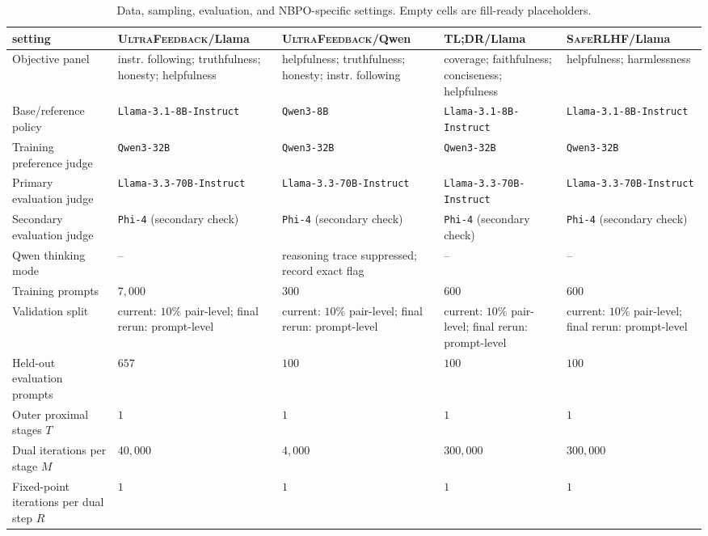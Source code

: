 \documentclass{article}
\theoremstyle{remark}
\theoremstyle{plain}
\begin{document}
\begin{table}[t]
\centering\scriptsize
\setlength{\tabcolsep}{1.1pt}
\caption{Data, sampling, evaluation, and NBPO-specific settings. Empty cells are fill-ready placeholders.}
\label{tab:data-sampling-hparams}
\begin{tabular}{@{}p{}p{}p{}p{}p{}@{}}
\toprule
setting & \textsc{UltraFeedback}/Llama & \textsc{UltraFeedback}/Qwen & \textsc{TL;DR}/Llama & \textsc{SafeRLHF}/Llama \\
\midrule
Objective panel & instr. following; truthfulness; honesty; helpfulness & helpfulness; truthfulness; honesty; instr. following & coverage; faithfulness; conciseness; helpfulness & helpfulness; harmlessness \\
Base/reference policy & \texttt{Llama-3.1-8B-\allowbreak Instruct} & \texttt{Qwen3-8B} & \texttt{Llama-3.1-8B-\allowbreak Instruct} & \texttt{Llama-3.1-8B-\allowbreak Instruct} \\
Training preference judge & \texttt{Qwen3-32B} & \texttt{Qwen3-32B} & \texttt{Qwen3-32B} & \texttt{Qwen3-32B} \\
Primary evaluation judge & \texttt{Llama-3.3-70B-\allowbreak Instruct} & \texttt{Llama-3.3-70B-\allowbreak Instruct} & \texttt{Llama-3.3-70B-\allowbreak Instruct} & \texttt{Llama-3.3-70B-\allowbreak Instruct} \\
Secondary evaluation judge & \texttt{Phi-4} (secondary check) & \texttt{Phi-4} (secondary check) & \texttt{Phi-4} (secondary check) & \texttt{Phi-4} (secondary check) \\
Qwen thinking mode & -- & reasoning trace suppressed; record exact flag & -- & -- \\
Training prompts & $7{,}000$ & $300$ & $600$ & $600$ \\
Validation split & current: $10\%$ pair-level; final rerun: prompt-level & current: $10\%$ pair-level; final rerun: prompt-level & current: $10\%$ pair-level; final rerun: prompt-level & current: $10\%$ pair-level; final rerun: prompt-level \\
Held-out evaluation prompts & $657$ & $100$ & $100$ & $100$ \\
Outer proximal stages $T$ & $1$ & $1$ & $1$ & $1$ \\
Dual iterations per stage $M$ & $40{,}000$ & $4{,}000$ & $300{,}000$ & $300{,}000$ \\
Fixed-point iterations per dual step $R$ & $1$ & $1$ & $1$ & $1$ \\

\end{tabular}
\end{table}
\end{document}
